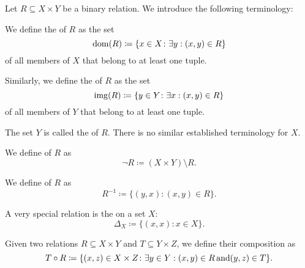 \begin{definition}\label{def:binary_relation}
  Let \( R \subseteq X \times Y \) be a binary relation. We introduce the following terminology:
  \begin{thmenum}[series=def:binary_relation]
     We define the  of \( R \) as the set
    \begin{equation*}
      \operatorname{dom}(R) \coloneqq \{ x \in X \colon \exists y: (x, y) \in R \}
    \end{equation*}
    of all members of \( X \) that belong to at least one tuple.

     Similarly, we define the  of \( R \) as the set
    \begin{equation*}
      \operatorname{img}(R) \coloneqq \{ y \in Y \colon \exists x: (x, y) \in R \}
    \end{equation*}
    of all members of \( Y \) that belong to at least one tuple.

     The set \( Y \) is called the  of \( R \). There is no similar established terminology for \( X \).

     We define  of \( R \) as
    \begin{equation*}
      \neg R \coloneqq (X \times Y) \setminus R.
    \end{equation*}

     We define  of \( R \) as
    \begin{equation*}
      R^{-1} \coloneqq \{ (y, x) \colon (x, y) \in R \}.
    \end{equation*}

     A very special relation is the  on a set \( X \):
    \begin{equation*}
      \Delta_X \coloneqq \{ (x, x) \colon x \in X \}.
    \end{equation*}

     Given two relations \( R \subseteq X \times Y \) and \( T \subseteq Y \times Z \), we define their composition as
    \begin{equation*}
      T \circ R \coloneqq \{ (x, z) \in X \times Z \colon \exists y \in Y: (x, y) \in R \mathop{\text{and}} (y, z) \in T \}.
    \end{equation*}
  \end{thmenum}


\end{definition}
